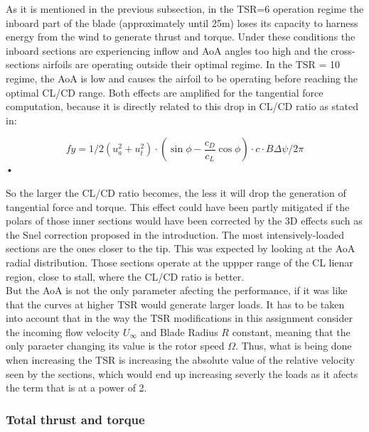 As it is mentioned in the previous subsection, in the TSR=6 operation regime the inboard part of the blade (approximately until 25m) loses its capacity to harness energy from the wind to generate thrust and torque. Under these conditions the inboard sections are experiencing inflow and AoA angles too high and the cross-sections airfoils are operating outside their optimal regime. In the TSR = 10 regime, the AoA is low and causes the airfoil to be operating before reaching the optimal CL/CD range. Both effects are amplified for the tangential force computation, because it is directly related to this drop in CL/CD ratio as stated in:

\begin{equation}
fy = 1/2 (u_a^2+u_t^2)\cdot (\sin \phi - \textbf{$\frac{c_D}{c_L}$} \cos \phi) \cdot c \cdot B \Delta \psi / 2 \pi
\end{equation}•

So the larger the CL/CD ratio becomes, the less it will drop the generation of tangential force and torque. This effect could have been partly mitigated if the polars of those inner sections would have been corrected by the 3D effects such as the Snel correction proposed in the introduction. The most intensively-loaded sections are the ones closer to the tip. This was expected by looking at the AoA radial distribution. Those sections operate at the uppper range of the CL lienar region, close to stall, where the CL/CD ratio is better. \\ 

But the AoA is not the only parameter afecting the performance, if it was like that the curves at higher TSR would generate larger loads. It has to be taken into account that in the way the TSR modifications in this assignment consider the incoming flow velocity $U_{\infty}$ and Blade Radius $R$ constant, meaning that the only paraeter changing its value is the rotor speed $\Omega$. Thus, what is being done when increasing the TSR is increasing the absolute value of the relative velocity seen by the sections, which would end up increasing severly the loads as it afects the term that is at a power of 2. 

\subsubsection{\textbf{Total thrust and torque} }

